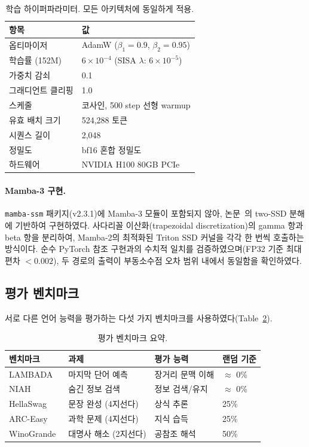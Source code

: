 \documentclass[11pt]{article}
\begin{document}
\begin{table}[h]
\centering
\small
\caption{학습 하이퍼파라미터. 모든 아키텍처에 동일하게 적용.}
\label{tab:hyperparams}
\begin{tabular}{ll}
\toprule
\textbf{항목} & \textbf{값} \\
\midrule
옵티마이저 & AdamW ($\beta_1 = 0.9$, $\beta_2 = 0.95$) \\
학습률 (152M) & $6 \times 10^{-4}$ (SISA $\lambda$: $6 \times 10^{-5}$) \\
가중치 감쇠 & 0.1 \\
그래디언트 클리핑 & 1.0 \\
스케줄 & 코사인, 500 step 선형 warmup \\
유효 배치 크기 & 524,288 토큰 \\
시퀀스 길이 & 2,048 \\
정밀도 & bf16 혼합 정밀도 \\
하드웨어 & NVIDIA H100 80GB PCIe \\
\bottomrule
\end{tabular}
\end{table}

\paragraph{Mamba-3 구현.} \texttt{mamba-ssm} 패키지(v2.3.1)에 Mamba-3 모듈이 포함되지 않아, 논문~\citep{mamba3}의 two-SSD 분해에 기반하여 구현하였다. 사다리꼴 이산화(trapezoidal discretization)의 gamma 항과 beta 항을 분리하여, Mamba-2의 최적화된 Triton SSD 커널을 각각 한 번씩 호출하는 방식이다. 순수 PyTorch 참조 구현과의 수치적 일치를 검증하였으며(FP32 기준 최대 편차 $< 0.002$), 두 경로의 출력이 부동소수점 오차 범위 내에서 동일함을 확인하였다.

\subsection{평가 벤치마크}

서로 다른 언어 능력을 평가하는 다섯 가지 벤치마크를 사용하였다(Table~\ref{tab:benchmarks}).

\begin{table}[h]
\centering
\small
\caption{평가 벤치마크 요약.}
\label{tab:benchmarks}
\begin{tabular}{llll}
\toprule
\textbf{벤치마크} & \textbf{과제} & \textbf{평가 능력} & \textbf{랜덤 기준} \\
\midrule
LAMBADA~\citep{lambada} & 마지막 단어 예측 & 장거리 문맥 이해 & $\approx$ 0\% \\
NIAH & 숨긴 정보 검색 & 정보 검색/유지 & $\approx$ 0\% \\
HellaSwag~\citep{hellaswag} & 문장 완성 (4지선다) & 상식 추론 & 25\% \\
ARC-Easy~\citep{arc} & 과학 문제 (4지선다) & 지식 습득 & 25\% \\
WinoGrande~\citep{winogrande} & 대명사 해소 (2지선다) & 공참조 해석 & 50\% \\
\bottomrule
\end{tabular}
\end{table}
\end{document}
